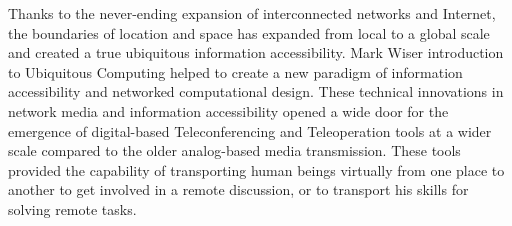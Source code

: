 Thanks to the never-ending expansion of interconnected networks and Internet, the boundaries of location and space has expanded from local to a global scale and created a true ubiquitous information accessibility. Mark Wiser\cite{weiser1994ubiquitous} introduction to Ubiquitous Computing helped to create a new paradigm of information accessibility and networked computational design. These technical innovations in network media and information accessibility opened a wide door for the emergence of digital-based Teleconferencing and Teleoperation tools at a wider scale compared to the older analog-based media transmission. These tools provided the capability of transporting human beings virtually from one place to another to get involved in a remote discussion, or to transport his skills for solving remote tasks. 

